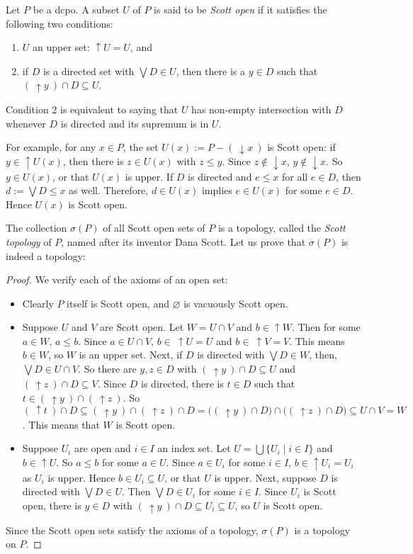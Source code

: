 \documentclass[12pt]{article}
\newcommand{\up}{\uparrow\!\!}
\newcommand{\down}{\downarrow\!\!}
\begin{document}
Let $P$ be a dcpo.  A subset $U$ of $P$ is said to be \emph{Scott open} if it satisfies the following two conditions:
\begin{enumerate}
\item $U$ an upper set: $\up U=U$, and 
\item if $D$ is a directed set with $\bigvee D\in U$, then there is a $y\in D$ such that $(\ \up y\ ) \cap D\subseteq U$.
\end{enumerate}
Condition 2 is equivalent to saying that $U$ has non-empty intersection with $D$ whenever $D$ is directed and its supremum is in $U$.  

For example, for any $x\in P$, the set $U(x):=P-(\ \down x\ )$ is Scott open: if $y\in \up U(x)$, then there is $z\in U(x)$ with $z\le y$.  Since $z\notin \down x$, $y\notin \down x$.  So $y\in U(x)$, or that $U(x)$ is upper.  If $D$ is directed and $e\le x$ for all $e\in D$, then $d:=\bigvee D\le x$ as well.  Therefore, $d\in U(x)$ implies $e\in U(x)$ for some $e\in D$.  Hence $U(x)$ is Scott open.

The collection $\sigma(P)$ of all Scott open sets of $P$ is a topology, called the \emph{Scott topology} of $P$, named after its inventor Dana Scott.  Let us prove that $\sigma(P)$ is indeed a topology:
\begin{proof}  We verify each of the axioms of an open set:
\begin{itemize}
\item Clearly $P$ itself is Scott open, and $\varnothing$ is vacuously Scott open.  
\item 
Suppose $U$ and $V$ are Scott open.  Let $W=U\cap V$ and $b\in \up W$.  Then for some $a\in W$, $a\le b$.  Since $a\in U\cap V$, $b\in\ \up U=U$ and $b\in\ \up V=V$.  This means $b\in W$, so $W$ is an upper set.  Next, if $D$ is directed with $\bigvee D\in W$, then, $\bigvee D \in U\cap V$.  So there are $y,z\in D$ with $(\ \up y\ ) \cap D\subseteq U$ and $(\ \up z\ ) \cap D\subseteq V$.  Since $D$ is directed, there is $t\in D$ such that $t\in (\ \up y\ ) \cap (\ \up z\ )$.  So $(\ \up t\ )\cap D\subseteq (\ \up y\ ) \cap (\ \up z\ )\cap D = \big( (\ \up y\ )\cap D \big)\cap \big( (\ \up z\ )\cap D\big)\subseteq U\cap V=W$.  This means that $W$ is Scott open.
\item
Suppose $U_i$ are open and $i\in I$ an index set.  Let $U=\bigcup \lbrace U_i \mid i\in I\rbrace$ and $b\in \up U$.  So $a\le b$ for some $a\in U$.  Since $a\in U_i$ for some $i\in I$, $b\in \up U_i=U_i$ as $U_i$ is upper.  Hence $b\in U_i\subseteq U$, or that $U$ is upper.  Next, suppose $D$ is directed with $\bigvee D\in U$.  Then $\bigvee D\in U_i$ for some $i\in I$.  Since $U_i$ is Scott open, there is $y\in D$ with $(\ \up y\ ) \cap D\subseteq U_i \subseteq U$, so $U$ is Scott open.
\end{itemize}
Since the Scott open sets satisfy the axioms of a topology, $\sigma(P)$ is a topology on $P$.
\end{proof}
\end{document}
